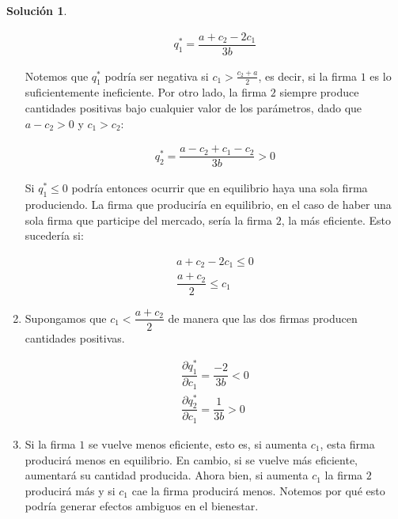 \documentclass[a4paper, 11pt]{article}
\theoremstyle{definition}
\newtheorem{solucion}{Soluci\'on}
\begin{document}
\begin{solucion}
\begin{enumerate}[label=(\alph*)]
\vspace*{-20pt}

 \begin{align*}
q_1^*=\dfrac{a+c_2-2c_1}{3b}
\end{align*}

\vspace*{-8pt}

Notemos que $q_1^*$ podría ser negativa si $c_1 > \frac{c_2+a}{2}$, es decir, si la firma $1$ es lo suficientemente ineficiente. Por otro lado, la firma $2$ siempre produce cantidades positivas bajo cualquier valor de los parámetros, dado que $a-c_2>0$ y $c_1>c_2$:

\vspace*{-20pt}

\begin{align*}
q_2^*=\dfrac{a-c_2+c_1-c_2}{3b}>0
 \end{align*}
 
 \vspace*{-8pt}
 
Si $q_1^*\leq 0$ podría entonces ocurrir que en equilibrio haya una sola firma produciendo. La firma que produciría en equilibrio, en el caso de haber una sola firma que participe del mercado, sería la firma $2$, la más eficiente. Esto sucedería si:
 
 \vspace*{-28pt}
 
 \begin{align*}
a+c_2-2c_1\leq 0\\
\dfrac{a+c_2}{2}\leq c_1
 \end{align*}
 \vspace*{-28pt}
\item Supongamos que $c_1<\dfrac{a+c_2}{2}$ de manera que las dos firmas producen cantidades positivas.

\vspace*{-12pt}

\begin{align*}
\dfrac{\partial q_1^*}{\partial c_1}=\dfrac{-2}{3b}<0\\
\dfrac{\partial q_2^*}{\partial c_1}=\dfrac{1}{3b}>0
\end{align*}

\item Si la firma $1$ se vuelve menos eficiente, esto es, si aumenta $c_1$, esta firma producirá menos en equilibrio. En cambio, si se vuelve más eficiente, aumentará su cantidad producida. Ahora bien, si aumenta $c_1$ la firma $2$ producirá más y si $c_1$ cae la firma producirá menos. Notemos por qué esto podría generar efectos ambiguos en el bienestar.


\end{enumerate}
\end{solucion}
\end{document}
